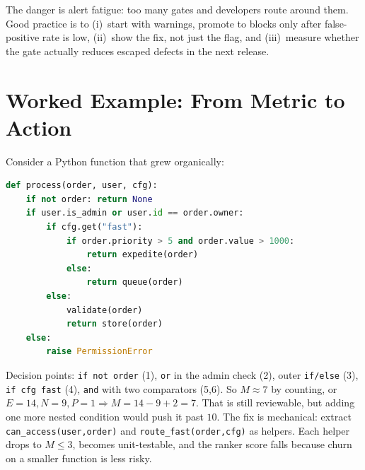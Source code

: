 The danger is alert fatigue: too many gates and developers route around them. Good practice is to (i)~start with warnings, promote to blocks only after false-positive rate is low, (ii)~show the fix, not just the flag, and (iii)~measure whether the gate actually reduces escaped defects in the next release.

\section{Worked Example: From Metric to Action}\label{sec:quality-worked}
Consider a Python function that grew organically:

\begin{lstlisting}[language=Python,caption={A function whose complexity is easy to misjudge.},label={lst:quality-ex}]
def process(order, user, cfg):
    if not order: return None
    if user.is_admin or user.id == order.owner:
        if cfg.get("fast"):
            if order.priority > 5 and order.value > 1000:
                return expedite(order)
            else:
                return queue(order)
        else:
            validate(order)
            return store(order)
    else:
        raise PermissionError
\end{lstlisting}

Decision points: \texttt{if not order} (1), \texttt{or} in the admin check (2), outer \texttt{if/else} (3), \texttt{if cfg fast} (4), \texttt{and} with two comparators (5,6). So $M\approx7$ by counting, or $E=14,N=9,P=1\Rightarrow M=14-9+2=7$. That is still reviewable, but adding one more nested condition would push it past $10$. The fix is mechanical: extract \texttt{can\_access(user,order)} and \texttt{route\_fast(order,cfg)} as helpers. Each helper drops to $M\le3$, becomes unit-testable, and the ranker score falls because churn on a smaller function is less risky.

